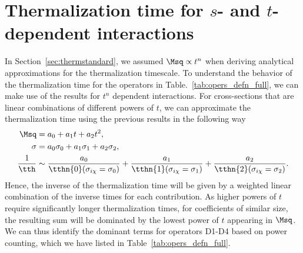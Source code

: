 \section{Thermalization time for $s$- and $t$-dependent interactions}
\label{sec:sdeptherm}


In Section~\ref{sec:thermstandard}, we assumed $\Msq\propto t^n$ when deriving analytical approximations for the thermalization timescale. To understand the behavior of the thermalization time for the operators in Table.~\ref{tab:opers_defn_full}, we can make use of the results for $t^n$ dependent interactions. For cross-sections that are linear combinations of different powers of $t$, we can approximate the thermalization time using the previous results in the following way
\begin{align}
\Msq &= a_0 + a_1 t + a_2 t^2,\\
\sigma &= a_0\sigma_0 + a_1 \sigma_1 + a_2 \sigma_2,\\
\frac{1}{\tth} &\sim \frac{a_0}{ \tthn{0}(\sigma_{i\chi}=\sigma_0)} + \frac{a_1} {\tthn{1}(\sigma_{i\chi}=\sigma_1)} 
 + \frac{a_2}{  \tthn{2}(\sigma_{i\chi}=\sigma_2)}. 
\label{eq:ttherm_weighted}
\end{align}
Hence, the inverse of the thermalization time will be given by a weighted linear combination of the inverse times for each contribution. As higher powers of $t$ require significantly longer thermalization times, for coefficients of similar size, the resulting sum will be dominated by the lowest power of $t$ appearing in  $\Msq$.  We can thus identify the dominant terms for operators D1-D4  based on power counting, which we have listed in Table~\ref{tab:opers_defn_full}.

